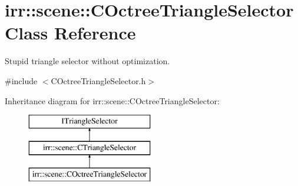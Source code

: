 \hypertarget{classirr_1_1scene_1_1_c_octree_triangle_selector}{\section{irr\-:\-:scene\-:\-:C\-Octree\-Triangle\-Selector Class Reference}
\label{classirr_1_1scene_1_1_c_octree_triangle_selector}
}


Stupid triangle selector without optimization.  




{\ttfamily \#include $<$C\-Octree\-Triangle\-Selector.\-h$>$}

Inheritance diagram for irr\-:\-:scene\-:\-:C\-Octree\-Triangle\-Selector\-:\begin{figure}[H]
\begin{center}
\leavevmode
\includegraphics[height=3.000000cm]{classirr_1_1scene_1_1_c_octree_triangle_selector}
\end{center}
\end{figure}
